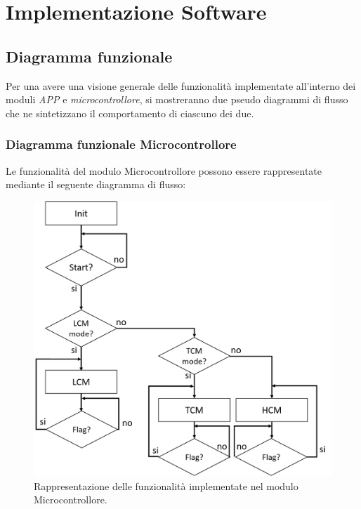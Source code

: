 \section{Implementazione Software}

\subsection{Diagramma funzionale}
Per una avere una visione generale delle funzionalità implementate all'interno dei moduli \textit{APP} e \textit{microcontrollore}, si mostreranno due pseudo diagrammi di flusso che ne sintetizzano il comportamento di ciascuno dei due.\\
\subsubsection{Diagramma funzionale Microcontrollore}
Le funzionalità del modulo Microcontrollore possono essere rappresentate mediante il seguente diagramma di flusso:
\begin{figure}[H]  
	\centering 
	\includegraphics[scale=0.3]{implementazione/diagramma.png}
	\caption{Rappresentazione delle funzionalità implementate nel modulo Microcontrollore.}
	\label{fig:diagrammaMicro}
\end{figure}


